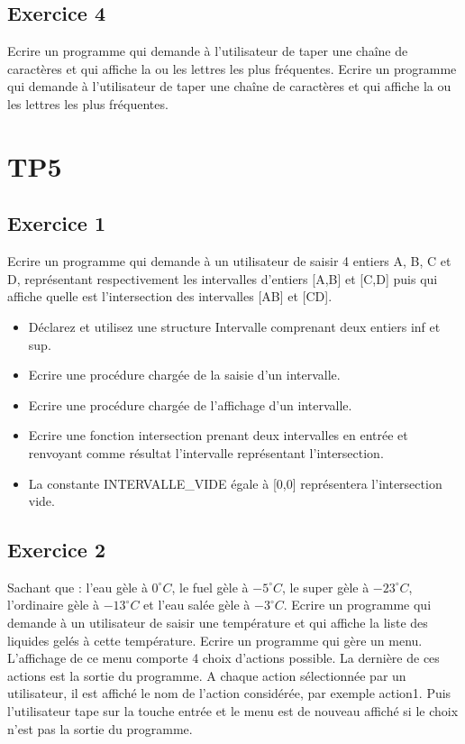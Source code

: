 \documentclass{article}
\begin{document}
		\subsection{Exercice 4}
			Ecrire un programme qui demande à l'utilisateur de taper une chaîne de caractères et qui affiche la ou les lettres les plus fréquentes.			Ecrire un programme qui demande à l'utilisateur de taper une chaîne de caractères et qui affiche la ou les lettres les plus fréquentes.			
			
	\section{TP5}
		\subsection{Exercice 1}
			Ecrire un programme qui demande à un utilisateur de saisir 4 entiers A, B, C et D, représentant respectivement les intervalles d'entiers [A,B] et [C,D] puis qui affiche quelle est l'intersection des intervalles [AB] et [CD].

			\begin{itemize}
				\item Déclarez et utilisez une structure Intervalle comprenant deux entiers inf et sup.
				\item Ecrire une procédure chargée de la saisie d'un intervalle.
				\item Ecrire une procédure chargée de l'affichage d'un intervalle.
				\item Ecrire une fonction intersection prenant deux intervalles en entrée et renvoyant comme résultat l'intervalle représentant l'intersection.
				\item La constante INTERVALLE\_VIDE égale à [0,0] représentera l'intersection vide.			
			\end{itemize}		
			
		\subsection{Exercice 2}
			Sachant que : l'eau gèle à $0^{\circ} C$, le fuel gèle à $-5^{\circ} C$, le super gèle à $-23^{\circ} C$, l'ordinaire gèle à $-13^{\circ} C$ et l'eau salée gèle à $-3^{\circ} C$. 
			Ecrire un programme qui demande à un utilisateur de saisir une température et qui affiche la liste des liquides gelés à cette température.
			Ecrire un programme qui gère un menu. L'affichage de ce menu comporte 4 choix d'actions possible. La dernière de ces actions est la sortie du programme. A chaque action sélectionnée par un utilisateur, 
			il est affiché le nom de l'action considérée, par exemple action1. Puis l'utilisateur tape sur la touche entrée et le menu est de nouveau affiché si le choix n'est pas la sortie du programme.
\end{document}
